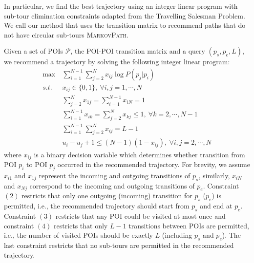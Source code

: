 In particular, we find the best trajectory using an integer linear program with
sub-tour elimination constraints adapted from the Travelling Salesman Problem\cite{opt98}.
We call our method that uses the transition matrix to recommend paths
that do not have circular sub-tours \textsc{MarkovPath}.

Given a set of POIs $\mathcal{P}$, the POI-POI transition matrix and a query $(p_s, p_e, L)$,
we recommend a trajectory by solving the following integer linear program:
\begin{align}
\max ~& \sum_{i=1}^{N-1} \sum_{j=2}^N x_{ij} \log P(p_j | p_i) \nonumber \\
s.t. ~& x_{ij} \in \{0, 1\}, ~\forall i, j = 1, \cdots, N \\
     & \sum_{j=2}^N x_{1j} = \sum_{i=1}^{N-1} x_{iN} = 1 \\
     & \sum_{i=1}^{N-1} x_{ik} = \sum_{j=2}^N x_{kj} \le 1, ~\forall k=2, \cdots, N-1 \\
     & \sum_{i=1}^{N-1} \sum_{j=2}^N x_{ij} = L-1 \\
     & u_i - u_j + 1 \le (N-1) (1-x_{ij}), ~\forall i, j = 2, \cdots, N
\end{align}
where $x_{ij}$ is a binary decision variable which determines whether transition from POI $p_i$ to POI $p_j$
occurred in the recommended trajectory.
For brevity, we assume $x_{i1}$ and $x_{1j}$ represent the incoming and outgoing transitions of $p_s$,
similarly, $x_{iN}$ and $x_{Nj}$ correspond to the incoming and outgoing transitions of $p_e$.
Constraint $(2)$ restricts that only one outgoing (incoming) transition for $p_s$ ($p_e$)
is permitted, i.e., the recommended trajectory should start from $p_s$ and end at $p_e$.
Constraint $(3)$ restricts that any POI could be visited at most once and constraint $(4)$
restricts that only $L-1$ transitions between POIs are permitted, i.e., the number of visited POIs should be
exactly $L$ (including $p_s$ and $p_e$).
The last constraint restricts that no sub-tours are permitted in the recommended trajectory.
